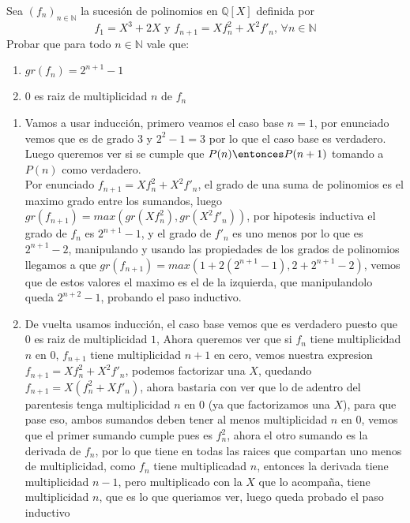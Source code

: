 \begin{enunciado}{\ejercicio}
    Sea $(f_n)_{n\in\mathbb{N}}$ la sucesión de polinomios en $\mathbb{Q}[X]$ definida por \\
    \[f_1 = X^3 + 2X \text{  y  } f_{n+1} = Xf_n^2+X^2f'_n,\, \forall n \in \mathbb{N}\]
    Probar que para todo $n \in \mathbb{N}$ vale que:
    \begin{enumerate}[label=\roman*)]
        \item $gr(f_n) = 2^{n+1} - 1$
        \item $0$ es raiz de multiplicidad $n$ de $f_n$
    \end{enumerate}
\end{enunciado}

\begin{enumerate}[label=\roman*)]
    \item Vamos a usar inducción, primero veamos el caso base $n = 1$, por enunciado vemos que es de grado 3
    y $2^2 - 1 = 3$ por lo que el caso base es verdadero. Luego queremos ver si se cumple que $P(n) \entonces P(n+1)$ tomando
    a $P(n)$ como verdadero. \\
    Por enunciado $f_{n+1} = Xf_n^2+X^2f'_n$, el grado de una suma de polinomios es el maximo grado entre los sumandos, luego
    $gr(f_{n+1}) = max(gr(Xf_n^2), gr(X^2f'_n))$, por hipotesis inductiva el grado de $f_n$ es $2^{n+1} -1$, y el grado de
    $f'_n$ es uno menos por lo que es $2^{n+1} -2$, manipulando y usando las propiedades de los grados de polinomios llegamos a que 
    $gr(f_{n+1}) = max(1 + 2(2^{n+1} - 1),2 + 2^{n+1} - 2)$, vemos que de estos valores el maximo es el de la izquierda, 
    que manipulandolo queda $2^{n+2} -1$, probando el paso inductivo.

    \item De vuelta usamos inducción, el caso base vemos que es verdadero puesto que $0$ es raiz de multiplicidad $1$,
    Ahora queremos ver que si $f_n$ tiene multiplicidad $n$ en 0, $f_{n+1}$ tiene multiplicidad $n+1$ en cero,
    vemos nuestra expresion $f_{n+1} = Xf_n^2+X^2f'_n$, podemos factorizar una $X$, quedando $f_{n+1} = X(f_n^2+Xf'_n)$, ahora bastaria
    con ver que lo de adentro del parentesis tenga multiplicidad $n$ en $0$ (ya que factorizamos una $X$), para que pase eso, ambos sumandos 
    deben tener al menos multiplicidad $n$ en $0$, vemos que el primer sumando cumple pues es $f_n^2$, ahora el otro sumando es la derivada de $f_n$, por 
    lo que tiene en todas las raices que compartan uno menos de multiplicidad, como $f_n$ tiene multiplicadad $n$, entonces la derivada tiene
    multiplicidad $n-1$, pero multiplicado con la $X$ que lo acompaña, tiene multiplicidad $n$, que es lo que queriamos ver, luego queda probado el paso inductivo
\end{enumerate}
